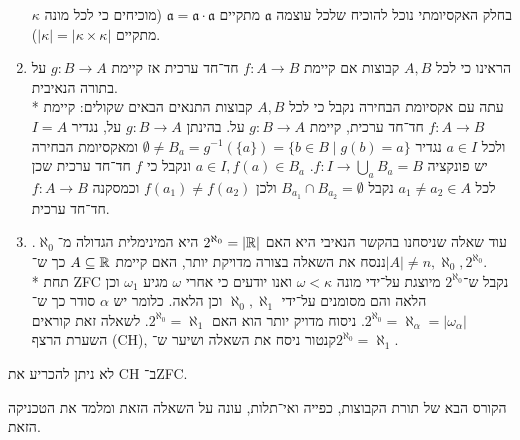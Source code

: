 \begin{enumerate}
		בחלק האקסיומתי נוכל להוכיח שלכל עוצמה $\mathfrak{a}$ מתקיים $\mathfrak{a} = \mathfrak{a} \cdot \mathfrak{a}$ (מוכיחים כי לכל מונה $\kappa$ מתקיים $|\kappa| = |\kappa \times \kappa|$).
	\item הראינו כי לכל $A, B$ קבוצות אם קיימת $f : A \to B$ חד־חד ערכית אז קיימת $g : B \to A$ על בתורה הנאיבית. \\*
		עתה עם אקסיומת הבחירה נקבל כי לכל $A, B$ קבוצות התנאים הבאים שקולים: קיימת $f : A \to B$ חד־חד ערכית, קיימת $g : B \to A$ על.
		בהינתן $g : B \to A$ על, נגדיר $I = A$ ולכל $a \in I$ נגדיר $\emptyset \ne B_a = g^{-1}(\{a\}) = \{ b \in B \mid g(b) = a \}$ ומאקסיומת הבחירה יש פונקציה $f : I \to \bigcup_a B_a = B$.
		$a \in I, f(a) \in B_a$ ונקבל כי $f$ חד־חד ערכית שכן לכל $a_1 \ne a_2 \in A$ נקבל $B_{a_1} \cap B_{a_2} = \emptyset$ ולכן $f(a_1) \ne f(a_2)$ וכמסקנה $f : A \to B$ חד־חד ערכית.
	\item עוד שאלה שניסחנו בהקשר הנאיבי היא האם $2^{\aleph_0} = |\mathbb{R}|$ היא המינימלית הגדולה מ־$\aleph_0$.
		ננסח את השאלה בצורה מדויקת יותר, האם קיימת $A \subseteq \mathbb{R}$ כך ש־$|A| \ne n, \aleph_0, 2^{\aleph_0}$. \\*
		תחת ZFC נקבל ש־$2^{\aleph_0}$ מיוצגת על־ידי מונה $\omega < \kappa$ ואנו יודעים כי אחרי $\omega$ מגיע $\omega_1$ וכן הלאה והם מסומנים על־ידי $\aleph_0, \aleph_1$ וכן הלאה.
		כלומר יש $\alpha$ סודר כך ש־$2^{\aleph_0} = \aleph_\alpha = |\omega_\alpha|$.
		ניסוח מדויק יותר הוא האם $2^{\aleph_0} = \aleph_1$.
		לשאלה זאת קוראים השערת הרצף (CH), קנטור ניסח את השאלה ושיער ש־$2^{\aleph_0} = \aleph_1$.
\end{enumerate}
\begin{theorem}[כהן]
	לא ניתן להכריע את CH ב־ZFC.\@
\end{theorem}
הקורס הבא של תורת הקבוצות, כפייה ואי־תלות, עונה על השאלה הזאת ומלמד את הטכניקה הזאת.


